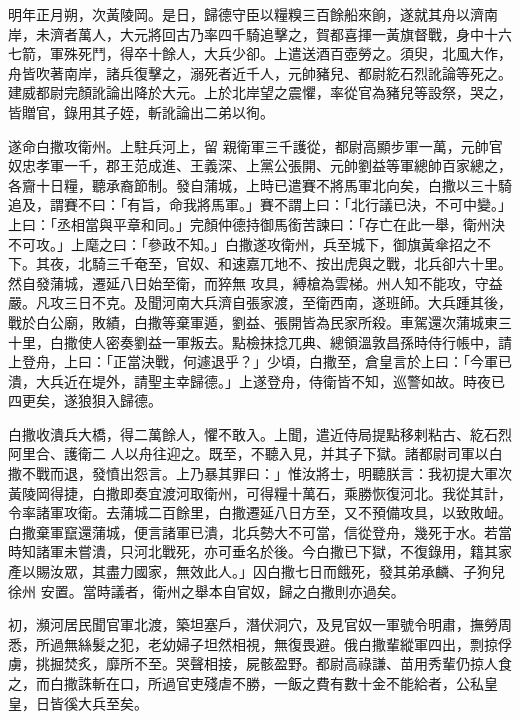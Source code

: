 \begin{pinyinscope}
 明年正月朔，次黃陵岡。是日，歸德守臣以糧糗三百餘船來餉，遂就其舟以濟南岸，未濟者萬人，大元將回古乃率四千騎追擊之，賀都喜揮一黃旗督戰，身中十六七箭，軍殊死鬥，得卒十餘人，大兵少卻。上遣送酒百壺勞之。須臾，北風大作，舟皆吹著南岸，諸兵復擊之，溺死者近千人，元帥豬兒、都尉紇石烈訛論等死之。建威都尉完顏訛論出降於大元。上於北岸望之震懼，率從官為豬兒等設祭，哭之，皆贈官，錄用其子姪，斬訛論出二弟以徇。



 遂命白撒攻衛州。上駐兵河上，留
 親衛軍三千護從，都尉高顯步軍一萬，元帥官奴忠孝軍一千，郡王范成進、王義深、上黨公張開、元帥劉益等軍總帥百家總之，各齎十日糧，聽承裔節制。發自蒲城，上時已遣賽不將馬軍北向矣，白撒以三十騎追及，謂賽不曰：「有旨，命我將馬軍。」賽不謂上曰：「北行議已決，不可中變。」上曰：「丞相當與平章和同。」完顏仲德持御馬銜苦諫曰：「存亡在此一舉，衛州決不可攻。」上麾之曰：「參政不知。」白撒遂攻衛州，兵至城下，御旗黃傘招之不下。其夜，北騎三千奄至，官奴、和速嘉兀地不、按出虎與之戰，北兵卻六十里。然自發蒲城，遷延八日始至衛，而猝無
 攻具，縛槍為雲梯。州人知不能攻，守益嚴。凡攻三日不克。及聞河南大兵濟自張家渡，至衛西南，遂班師。大兵踵其後，戰於白公廟，敗績，白撒等棄軍遁，劉益、張開皆為民家所殺。車駕還次蒲城東三十里，白撒使人密奏劉益一軍叛去。點檢抹捻兀典、總領溫敦昌孫時侍行帳中，請上登舟，上曰：「正當決戰，何遽退乎？」少頃，白撒至，倉皇言於上曰：「今軍已潰，大兵近在堤外，請聖主幸歸德。」上遂登舟，侍衛皆不知，巡警如故。時夜已四更矣，遂狼狽入歸德。



 白撒收潰兵大橋，得二萬餘人，懼不敢入。上聞，遣近侍局提點移剌粘古、紇石烈阿里合、護衛二
 人以舟往迎之。既至，不聽入見，并其子下獄。諸都尉司軍以白撒不戰而退，發憤出怨言。上乃暴其罪曰：」惟汝將士，明聽朕言：我初提大軍次黃陵岡得捷，白撒即奏宜渡河取衛州，可得糧十萬石，乘勝恢復河北。我從其計，令率諸軍攻衛。去蒲城二百餘里，白撒遷延八日方至，又不預備攻具，以致敗衄。白撒棄軍竄還蒲城，便言諸軍已潰，北兵勢大不可當，信從登舟，幾死于水。若當時知諸軍未嘗潰，只河北戰死，亦可垂名於後。今白撒已下獄，不復錄用，籍其家產以賜汝眾，其盡力國家，無效此人。」囚白撒七日而餓死，發其弟承麟、子狗兒徐州
 安置。當時議者，衛州之舉本自官奴，歸之白撒則亦過矣。



 初，瀕河居民聞官軍北渡，築坦塞戶，潛伏洞穴，及見官奴一軍號令明肅，撫勞周悉，所過無絲髮之犯，老幼婦子坦然相視，無復畏避。俄白撒輩縱軍四出，剽掠俘虜，挑掘焚炙，靡所不至。哭聲相接，屍骸盈野。都尉高祿謙、苗用秀輩仍掠人食之，而白撒誅斬在口，所過官吏殘虐不勝，一飯之費有數十金不能給者，公私皇皇，日皆徯大兵至矣。




\end{pinyinscope}
